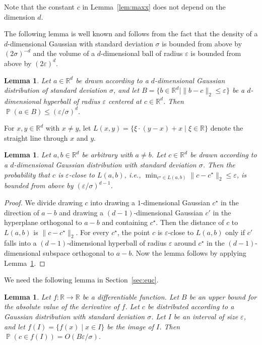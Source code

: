 \documentclass[11pt,DIV=12,a4paper]{scrartcl}
\newtheorem{lemma}[claim]{Lemma}
\newcommand{\real}{\ensuremath{\mathbb{R}}}
\newcommand{\eps}{\varepsilon}
\DeclareMathOperator{\probab}{\mathbb{P}}
\begin{document}
Note that the constant $c$ in Lemma~\ref{lem:maxx} does not depend on the dimension $d$.

The following lemma is well known and follows from the
fact that the density of a $d$-dimensional Gaussian with standard deviation
$\sigma$ is bounded from above by $(2\sigma)^{-d}$ and the volume of a $d$-dimensional ball of radius
$\eps$ is bounded from above by $(2\eps)^d$.

\begin{lemma}
\label{lem:ball}
Let $a \in \real^d$ be drawn according to a $d$-dimensional Gaussian distribution
of standard deviation $\sigma$, and let $B = \{b \in \real^d \mid \|b-c\|_2 \leq \eps\}$ be a $d$-dimensional hyperball
of radius $\eps$ centered at $c \in \real^d$.
Then $\probab(a \in B) \leq (\eps/\sigma)^d$.
\end{lemma}

For $x, y \in \real^d$ with $x \neq y$, let
$L(x,y) = \{\xi \cdot (y-x)  + x \mid \xi \in \real\}$
denote the straight line through $x$ and $y$.


\begin{lemma}
\label{lem:closeline}
Let $a, b  \in \real^d$ be arbitrary with $a \neq b$. Let $c \in \real^d$
be drawn according to a $d$-dimensional Gaussian distribution with standard deviation $\sigma$.
Then the probability that $c$ is $\eps$-close to $L(a, b)$, i.e.,
$\min_{c^\star \in L(a,b)} \|c-c^\star\|_2 \leq \eps$, is bounded from above by
$(\eps/\sigma)^{d-1}$.
\end{lemma}


\begin{proof}
We divide drawing $c$ into drawing a $1$-dimensional Gaussian $c^\star$ in
the direction of $a-b$
and drawing a $(d-1)$-dimensional Gaussian $c'$ in the hyperplane orthogonal to $a-b$
and containing $c^\star$. Then the distance of $c$ to $L(a,b)$ is $\|c-c^\star\|_2$.
For every $c^\star$, the point $c$ is $\eps$-close to $L(a,b)$ only if
$c'$ falls into a $(d-1)$-dimensional hyperball of radius $\eps$ around $c^\star$
in the $(d-1)$-dimensional subspace orthogonal to $a-b$.
Now the lemma follows by applying Lemma~\ref{lem:ball}.
\end{proof}


We need the following lemma in Section~\ref{sec:euc}.

\begin{lemma}
\label{lem:fctgauss}
Let $f: \real \to \real$ be a differentiable function.
Let $B$ be an upper bound for the absolute value of the derivative of $f$. Let $c$ be distributed
according to a Gaussian distribution with standard deviation $\sigma$.
Let $I$ be an interval of size $\eps$, and let $f(I) = \{f(x) \mid x \in I\}$
be the image of $I$.
Then $\probab(c \in f(I)) = O(B\eps/\sigma)$.
\end{lemma}
\end{document}
